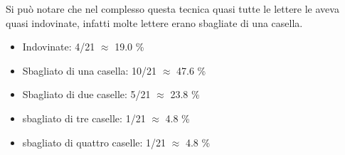\documentclass{report}
\begin{document}
Si può notare che nel complesso questa tecnica quasi tutte le lettere le aveva quasi indovinate, infatti molte lettere erano sbagliate di una casella.

\begin{itemize}
    \item Indovinate: 4/21 $\approx$ 19.0 \%
    \item Sbagliato di una casella: 10/21 $\approx$ 47.6 \%
    \item Sbagliato di due caselle: 5/21 $\approx$ 23.8 \%
    \item sbagliato di tre caselle: 1/21 $\approx$ 4.8 \%
    \item sbagliato di quattro caselle: 1/21 $\approx$ 4.8 \%
\end{itemize}
\end{document}
